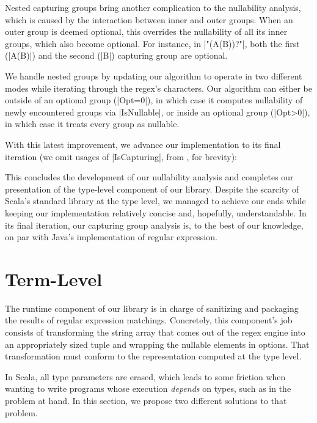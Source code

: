 \regexIsNullable

Nested capturing groups bring another complication to the nullability analysis, which is caused by the interaction between inner and outer groups.
When an outer group is deemed optional, this overrides the nullability of all its inner groups, which also become optional.
For instance, in |"(A(B))?"|, both the first (|A(B)|) and the second (|B|) capturing group are optional.

We handle nested groups by updating our algorithm to operate in two different modes while iterating through the regex's characters.
Our algorithm can either be outside of an optional group (|Opt=0|), in which case it computes nullability of newly encountered groups via |IsNullable|, or inside an optional group (|Opt>0|), in which case it treats every group as nullable.

With this latest improvement, we advance our implementation to its final iteration (we omit usages of |IsCapturing|, from , for brevity):

\regexLastIteration

This concludes the development of our nullability analysis and completes our presentation of the type-level component of our library.
Despite the scarcity of Scala's standard library at the type level, we managed to achieve our ends while keeping our implementation relatively concise and, hopefully, understandable.
In its final iteration, our capturing group analysis is, to the best of our knowledge, on par with Java's implementation of regular expression.

\section{Term-Level}
\label{sec:term-level}

The runtime component of our library is in charge of sanitizing and packaging the results of regular expression matchings.
Concretely, this component's job consists of transforming the string array that comes out of the regex engine into an appropriately sized tuple and wrapping the nullable elements in options.
That transformation must conform to the representation computed at the type level.

In Scala, all type parameters are erased, which leads to some friction when wanting to write programs whose execution \emph{depends} on types, such as in the problem at hand. In this section, we propose two different solutions to that problem.

